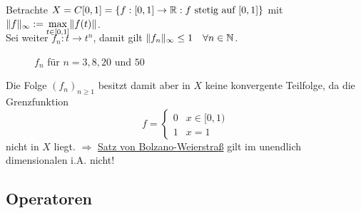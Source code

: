 \begin{beispiel}
	Betrachte $X = C[0, 1] = \{ f : [0, 1] \rightarrow \mathbb{R}: f \text{ stetig auf } [0, 1] \} $ mit $\| f \|_{\infty} :=  \smash{\displaystyle\max_{t \in [0, 1]}}  \| f(t) \|$. \\ 
	Sei weiter $f_{n} : t \rightarrow t^{n}$, damit gilt $\| f_{n} \|_{\infty} \leq 1 \quad \forall n \in \mathbb{N}$.	
	\begin{figure}[H]	
		\begin{center}					
			\caption{$f_{n}$ für $n = 3, 8, 20$ und $50$}
		\end{center}
	\end{figure}					
	Die Folge $(f_{n})_{n \geq 1}$ besitzt damit aber in $X$ keine konvergente Teilfolge, da die Grenzfunktion
		\[ f = \begin{cases} 0 & x \in [0, 1) \\ 1 & x = 1 \end{cases} \]
	nicht in $X$ liegt. $ \Rightarrow $ \hyperref[satz:1.1-BolzanoWeierstrass]{Satz von Bolzano-Weierstra{\ss}} gilt im unendlich dimensionalen i.A. nicht!
\end{beispiel}


\subsection*{Operatoren}


